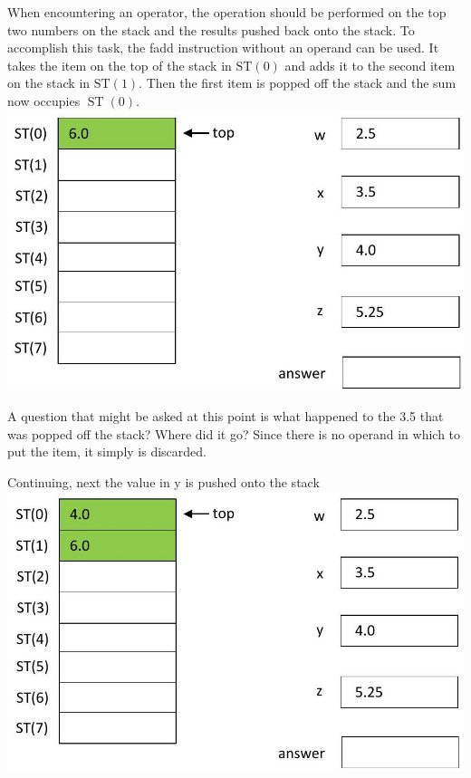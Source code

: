 \documentclass[10pt]{article}
\begin{document}
When encountering an operator, the operation should be performed on the top two numbers on the stack and the results pushed back onto the stack. To accomplish this task, the fadd instruction without an operand can be used. It takes the item on the top of the stack in $\mathrm{ST}(0)$ and adds it to the second item on the stack in $\mathrm{ST}(1)$. Then the first item is popped off the stack and the sum now occupies $\operatorname{ST}(0)$.\\
\includegraphics[max width=\textwidth, center]{2025_03_24_ebe50cc223a6fbc49eecg-227}

A question that might be asked at this point is what happened to the 3.5 that was popped off the stack? Where did it go? Since there is no operand in which to put the item, it simply is discarded.

Continuing, next the value in y is pushed onto the stack\\
\includegraphics[max width=\textwidth, center]{2025_03_24_ebe50cc223a6fbc49eecg-228(1)}
\end{document}
